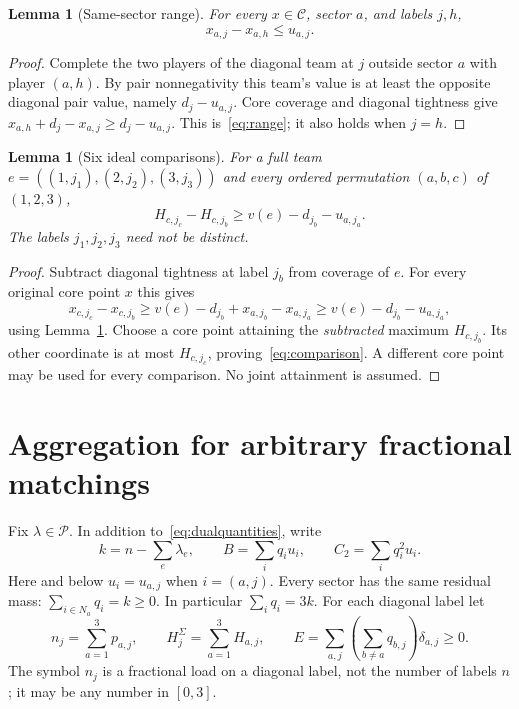 \documentclass[11pt]{article}
\newtheorem{lemma}[theorem]{Lemma}
\theoremstyle{remark}
\newcommand{\core}{\mathcal C}
\newcommand{\pack}{\mathcal P}
\begin{document}
\begin{lemma}[Same-sector range]\label{lem:range}
For every $x\in\core$, sector $a$, and labels $j,h$,
\begin{equation}\label{eq:range}
                         x_{a,j}-x_{a,h}\le u_{a,j}.
\end{equation}
\end{lemma}
\begin{proof}
Complete the two players of the diagonal team at $j$ outside sector $a$
with player $(a,h)$. By pair nonnegativity this team's value is at least
the opposite diagonal pair value, namely $d_j-u_{a,j}$.
Core coverage and diagonal tightness give
$x_{a,h}+d_j-x_{a,j}\ge d_j-u_{a,j}$.
This is~\eqref{eq:range}; it also holds when $j=h$.
\end{proof}

\begin{lemma}[Six ideal comparisons]\label{lem:comparison}
For a full team $e=((1,j_1),(2,j_2),(3,j_3))$ and every ordered
permutation $(a,b,c)$ of $(1,2,3)$,
\begin{equation}\label{eq:comparison}
         H_{c,j_c}-H_{c,j_b}\ge v(e)-d_{j_b}-u_{a,j_a}.
\end{equation}
The labels $j_1,j_2,j_3$ need not be distinct.
\end{lemma}
\begin{proof}
Subtract diagonal tightness at label $j_b$ from coverage of $e$.
For every original core point $x$ this gives
\[
 x_{c,j_c}-x_{c,j_b}
 \ge v(e)-d_{j_b}+x_{a,j_b}-x_{a,j_a}
 \ge v(e)-d_{j_b}-u_{a,j_a},
\]
using Lemma~\ref{lem:range}. Choose a core point attaining the
\emph{subtracted} maximum $H_{c,j_b}$. Its other coordinate is at most
$H_{c,j_c}$, proving~\eqref{eq:comparison}. A different core point may
be used for every comparison. No joint attainment is assumed.
\end{proof}

\section{Aggregation for arbitrary fractional matchings}\label{sec:aggregation}
Fix $\lambda\in\pack$. In addition to~\eqref{eq:dualquantities}, write
\begin{equation}\label{eq:residual}
 k=n-\sum_e\lambda_e,\qquad
 B=\sum_iq_iu_i,\qquad C_2=\sum_iq_i^2u_i.
\end{equation}
Here and below $u_i=u_{a,j}$ when $i=(a,j)$. Every sector has the same
residual mass: $\sum_{i\in N_a}q_i=k\ge0$. In particular $\sum_iq_i=3k$.
For each diagonal label let
\[
 n_j=\sum_{a=1}^3p_{a,j},\qquad H_j^\Sigma=\sum_{a=1}^3H_{a,j},\qquad
 E=\sum_{a,j}\left(\sum_{b\ne a}q_{b,j}\right)\delta_{a,j}\ge0.
\]
The symbol $n_j$ is a fractional load on a diagonal label, not the number
of labels $n$; it may be any number in $[0,3]$.
\end{document}
